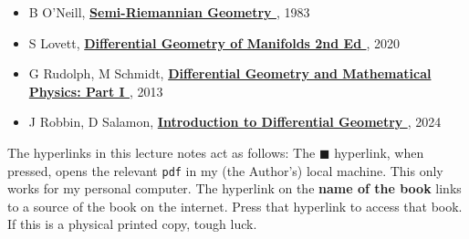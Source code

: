 \begin{itemize}[]

	\item[
		\href{run:C:/Users/verci/Documents/Reference Books/Physics/Semi-Riemannian Geometry [O'Neill].pdf
		}{$\blacksquare$}
	]
	B O’Neill,
	\textbf{\href{https://article.sk/book/wxWbnq3A2e/semiriemannian-geometry.html
	}{
		Semi-Riemannian Geometry%
	}}, 1983

	\item[
		\href{run:C:/Users/verci/Documents/Reference Books/Physics/Differential Geometry of Manifolds 2nd Ed. [Lovett].pdf
		}{$\blacksquare$}
	]
	S Lovett,
	\textbf{\href{https://article.sk/book/92rldR3Kgv/differential-geometry-of-manifolds-second-edition.html
	}{
		Differential Geometry of Manifolds 2nd Ed%
	}}, 2020

	\item[
		$\blacksquare$
	]
	G Rudolph, M Schmidt,
	\textbf{\href{https://article.sk/book/M6xqNmzPgW/differential-geometry-and-mathematical-physics-part-i-manifolds-lie-groups-and-hamiltonian-system.html
	}{
		Differential Geometry and Mathematical Physics: Part I%
	}}, 2013

	\item[
		\href{run:C:/Users/verci/Documents/Reference Books/Physics/Introduction to Differential Geometry [Robbin, Salamon].pdf
		}{$\blacksquare$}
	]
	J Robbin, D Salamon,
	\textbf{\href{https://webapps.math.uci.edu/~brusso/diffgeom311pp.pdf?utm_source=chatgpt.com
	}{
		Introduction to Differential Geometry%
	}}, 2024
\end{itemize}


\begin{note}
	The hyperlinks in this lecture notes act as follows: The {\color{blue} $\blacksquare$} 
	hyperlink, when pressed, opens the relevant \texttt{pdf} in my (the Author's) local machine. This only
	works for my personal computer. The hyperlink on the {\color{blue}\textbf{name of the book}} links to a source
	of the book on the internet. Press that hyperlink to access that book.
	If this is a physical printed copy, tough luck.
\end{note}
